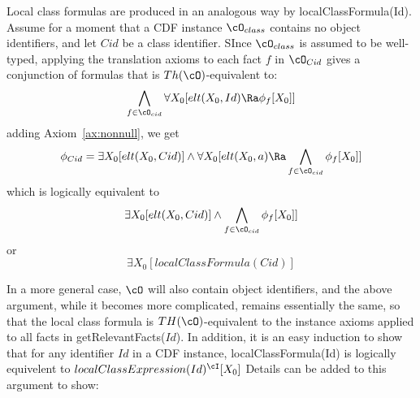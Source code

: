 
Local class formulas are produced in an analogous way by {\sf
localClassFormula(Id)}.  Assume for a moment that a CDF instance
$\cO_{class}$ contains no object identifiers, and let $Cid$ be a class
identifier.  SInce $\cO_{class}$ is assumed to be well-typed, applying
the translation axioms to each fact $f$ in $\cO_{Cid}$ gives a
conjunction of formulas that is $Th(\cO)$-equivalent to:
\[ 
\bigwedge_{f \in \cO_{cid}} \forall X_0 [elt(X_0,Id) \Ra \phi_f[X_0]]
\]
adding Axiom~\ref{ax:nonnull}, we get 
\[ 
\phi_{Cid} = \exists X_0 [elt(X_0,Cid)] \wedge \forall X_0 [elt(X_0,a) \Ra
				\bigwedge_{f \in \cO_{cid}} \phi_f[X_0]] 
\]
which is logically equivalent to 
\[ 
\exists X_0 [elt(X_0,Cid)] \wedge \bigwedge_{f \in \cO_{cid}} \phi_f[X_0]] 
\]
or 
\[ 
\exists X_0 [localClassFormula(Cid)] 
\]

In a more general case, $\cO$ will also contain object identifiers,
and the above argument, while it becomes more complicated, remains
essentially the same, so that the local class formula is
$TH(\cO)$-equivalent to the instance axioms applied to all facts in
{\sf getRelevantFacts($Id$)}.  In addition, it is an easy induction to
show that for any identifier $Id$ in a CDF instance, {\sc
localClassFormula(Id)} is logically equivelent to
$localClassExpression(Id)^{\cI}[X_0]$
%
%
Details can be added to this argument to show: 

